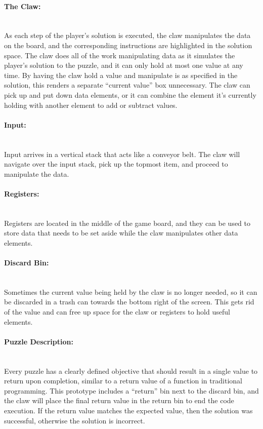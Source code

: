 \paragraph{The Claw:} ~\\
As each step of the player's solution is executed, the claw manipulates the data on the board, and the corresponding instructions are highlighted in the solution space.
The claw does all of the work manipulating data as it simulates the player's solution to the puzzle, and it can only hold at most one value at any time.
By having the claw hold a value and manipulate is as specified in the solution, this renders a separate ``current value'' box unnecessary.
The claw can pick up and put down data elements, or it can combine the element it's currently holding with another element to add or subtract values.

\paragraph{Input:} ~\\
Input arrives in a vertical stack that acts like a conveyor belt. The claw will navigate over the input stack, pick up the topmost item, and proceed to manipulate the data.

\paragraph{Registers:} ~\\
Registers are located in the middle of the game board, and they can be used to store data that needs to be set aside while the claw manipulates other data elements.

\paragraph{Discard Bin:} ~\\
Sometimes the current value being held by the claw is no longer needed, so it can be discarded in a trash can towards the bottom right of the screen. This gets rid of the value and can free up space for the claw or registers to hold useful elements.

\paragraph{Puzzle Description:} ~\\
Every puzzle has a clearly defined objective that should result in a single value to return upon completion, similar to a return value of a function in traditional programming. This prototype includes a ``return'' bin next to the discard bin, and the claw will place the final return value in the return bin to end the code execution. If the return value matches the expected value, then the solution was successful, otherwise the solution is incorrect.\\



